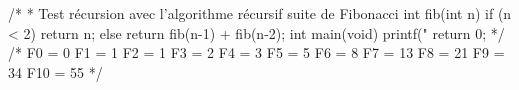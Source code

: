 /*
	* Test récursion avec l'algorithme récursif suite de Fibonacci
	int fib(int n) {
	  if (n < 2)
		return n;
	  else
		return fib(n-1) + fib(n-2);
	}
	int main(void) {
		printf("%
		return 0;
	}
*/
/*
 F0 = 0
 F1 = 1
 F2 = 1
 F3 = 2
 F4 = 3
 F5 = 5
 F6 = 8
 F7 = 13
 F8 = 21
 F9 = 34
 F10 = 55
*/
	\FI
